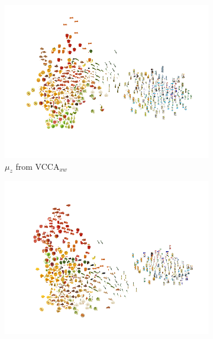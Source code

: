 
\begin{figure}[!tp]
     \centering
     \begin{subfigure}[b]{0.49\textwidth}
         \centering
         \includegraphics[width=\textwidth]{PaperB/figures_and_tables/latent_space_visualizations/pca_latents_vcca_xw_seed2.png}
         \vspace{-4mm}
         \caption{$\mu_{z}$ from VCCA$_{x w}$}
         \label{fig:pca_vcca_xw_z}
     \end{subfigure} 
     \begin{subfigure}[b]{0.49\textwidth}
         \centering
         \includegraphics[width=\textwidth]{PaperB/figures_and_tables/private_latent_space_visualizations/pca_z_vaecca_private_xw_seed1.png}

\end{subfigure}
\end{figure}
